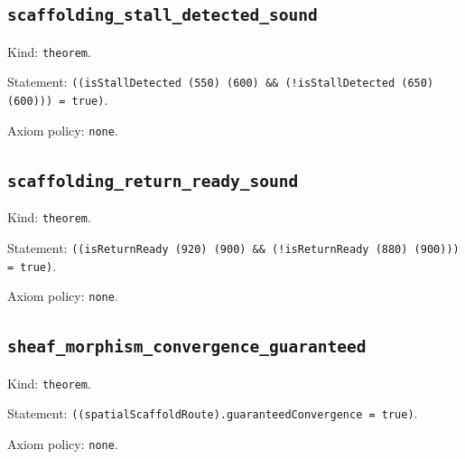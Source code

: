 \documentclass[11pt]{article}
\begin{document}
\subsection*{\texttt{scaffolding\_stall\_detected\_sound}}
\noindent Kind: \texttt{theorem}.\par
\noindent Statement: \texttt{((isStallDetected (550) (600) \&\& (!isStallDetected (650) (600))) = true)}.\par
\noindent Axiom policy: \texttt{none}.\par
\subsection*{\texttt{scaffolding\_return\_ready\_sound}}
\noindent Kind: \texttt{theorem}.\par
\noindent Statement: \texttt{((isReturnReady (920) (900) \&\& (!isReturnReady (880) (900))) = true)}.\par
\noindent Axiom policy: \texttt{none}.\par
\subsection*{\texttt{sheaf\_morphism\_convergence\_guaranteed}}
\noindent Kind: \texttt{theorem}.\par
\noindent Statement: \texttt{((spatialScaffoldRoute).guaranteedConvergence = true)}.\par
\noindent Axiom policy: \texttt{none}.\par
\end{document}
